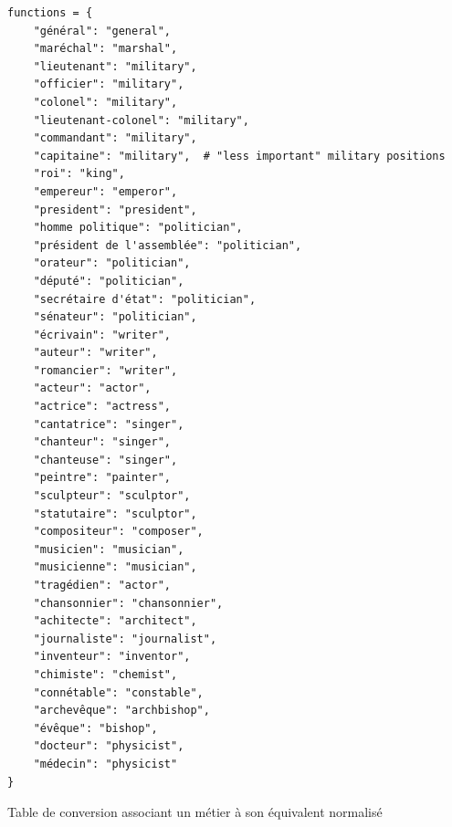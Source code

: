 \begin{listing}[p]
	\begin{verbatim}
functions = {
	"général": "general",
	"maréchal": "marshal",
	"lieutenant": "military",
	"officier": "military",
	"colonel": "military",
	"lieutenant-colonel": "military",
	"commandant": "military",
	"capitaine": "military",  # "less important" military positions
	"roi": "king",
	"empereur": "emperor",
	"president": "president",
	"homme politique": "politician",
	"président de l'assemblée": "politician",
	"orateur": "politician",
	"député": "politician",
	"secrétaire d'état": "politician",
	"sénateur": "politician",
	"écrivain": "writer",
	"auteur": "writer",
	"romancier": "writer",
	"acteur": "actor",
	"actrice": "actress",
	"cantatrice": "singer",
	"chanteur": "singer",
	"chanteuse": "singer",
	"peintre": "painter",
	"sculpteur": "sculptor",
	"statutaire": "sculptor",
	"compositeur": "composer",
	"musicien": "musician",
	"musicienne": "musician",
	"tragédien": "actor",
	"chansonnier": "chansonnier",
	"achitecte": "architect",
	"journaliste": "journalist",
	"inventeur": "inventor",
	"chimiste": "chemist",
	"connétable": "constable",
	"archevêque": "archbishop",
	"évêque": "bishop",
	"docteur": "physicist",
	"médecin": "physicist"
}		
	\end{verbatim}
	\caption{Table de conversion associant un métier à son équivalent normalisé}
	\label{appendix:convfunction}
\end{listing}

